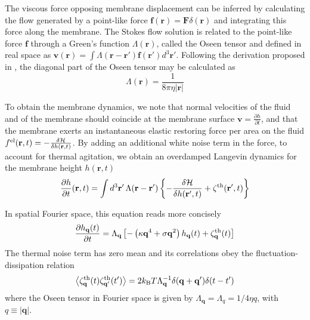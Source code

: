 \documentclass[graybox]{svmult}
\begin{document}
The viscous force opposing membrane displacement can be inferred by calculating the flow generated by a point-like force $\mathbf{f}(\mathbf{r}) =  \mathbf{F}\delta(\mathbf{r})$ and integrating this force along the membrane. The Stokes flow solution is related to the point-like force $\mathbf{f}$ through a Green's function $\Lambda(\mathbf{r})$, called the Oseen tensor \cite{Doi:1988} and defined in real space as
$\mathbf{v}(\mathbf{r}) = \int \Lambda(\mathbf{r}-\mathbf{r}')\mathbf{f}(\mathbf{r}')d^3\mathbf{r}'$.
Following the derivation proposed in \cite{Doi:1988}, the diagonal part of the Oseen tensor may be calculated as
\begin{equation}
\Lambda(\mathbf{r}) = \frac{1}{8\pi\eta|\mathbf{r}|}
\end{equation}

To obtain the membrane dynamics, we note that normal velocities of the fluid and of the membrane should coincide at the membrane surface $\mathbf{v} = \frac{\partial h}{\partial t}$, and that the membrane exerts an instantaneous elastic restoring force per area on the fluid $f^{\rm{el}}(\mathbf{r},t) = - \frac{\delta\mathcal{H}}{\delta h(\mathbf{r},t)}$. By adding an additional white noise term in the force, to account for thermal agitation, we obtain an overdamped Langevin dynamics for the membrane height $h(\mathbf{r},t)$
\begin{equation}
\frac{\partial h}{\partial t}(\mathbf{r},t) = \int d^3\mathbf{r}' \,\Lambda(\mathbf{r} - \mathbf{r}') \left\lbrace - \frac{\delta\mathcal{H}}{\delta h(\mathbf{r}',t)} + \zeta^{\rm{th}}(\mathbf{r}',t)\right\rbrace
\end{equation}

In spatial Fourier space, this equation reads more concisely
\begin{equation}
\frac{\partial h_{\mathbf{q}}(t)}{\partial t} = \Lambda_{\mathbf{q}}\left[ - \left(\kappa \mathbf{q}^4 +\sigma \mathbf{q}^2 \right)h_{\mathbf{q}}(t) + \zeta^{\rm{th}}_{\mathbf{q}}(t)\right]
\label{eq:FourierLangevinEqDynamics}
\end{equation}
The thermal noise term has zero mean and its correlations obey the fluctuation-dissipation relation
\begin{equation}
\label{eq:EquilibriumNoiseCorrelation}
\left\langle \zeta^{\rm{th}}_{\mathbf{q}}(t)\zeta^{\rm{th}}_{\mathbf{q'}}(t') \right\rangle = 2k_{\rm{B}}T\Lambda_{\mathbf{q}}^{-1}\delta(\mathbf{q}+\mathbf{q}')\delta(t-t')
\end{equation}
where the Oseen tensor in Fourier space is given by $\Lambda_{\mathbf{q}} = \Lambda_q = 1/4\eta q$, with $q \equiv |\mathbf{q}|$.
\end{document}
